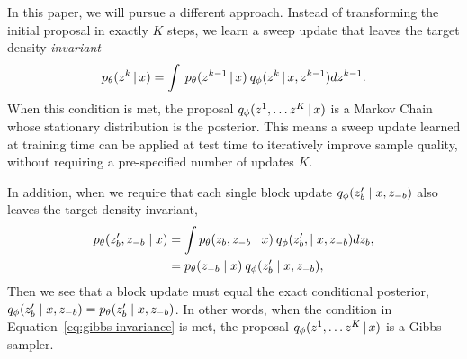 \documentclass{article}
\theoremstyle{definition}
\begin{document}
In this paper, we will pursue a different approach. Instead of transforming the initial proposal in exactly $K$ steps, we learn a sweep update that leaves the target density \emph{invariant}
\begin{equation}
    \label{eq:kernel-invariance}
    p_\theta(z^k \,|\, x) = \int \: p_\theta(z^{k-1} \,|\, x) \: q_\phi(z^k \,|\,x, z^{k-1}) d z^{k-1}.
\end{equation}
When this condition is met, the proposal $q_\phi(z^1, \ldots z^K \,|\, x)$ is a Markov Chain whose stationary distribution is the posterior. 
This means a sweep update learned at training time can be applied at test time to iteratively improve sample quality, without requiring a pre-specified number of updates $K$.


In addition, when we require that each single block update $q_\phi(z'_b \mid x, z_{-b})$ also leaves the target density invariant,
\begin{align}
    \label{eq:gibbs-invariance}
    p_\theta(z'_b, z_{-b} \mid x)
    &= 
    \int 
    p_\theta(z_b, z_{-b} \mid x) \:
    q_\phi(z'_b, \mid x, z_{-b}) 
    dz_{b},
    \\
    &= 
    p_\theta(z_{-b} \mid x) \:
    q_\phi(z'_b \mid x, z_{-b})
    , \nonumber
\end{align}
Then we see that a block update must equal the exact conditional posterior, $q_\phi(z'_b \mid x, z_{-b}) = p_\theta(z'_b \mid x, z_{-b})$.
In other words, when the condition in Equation~\ref{eq:gibbs-invariance} is met, the proposal $q_\phi(z^1, \ldots z^K \,|\, x)$ is a Gibbs sampler.
\end{document}
